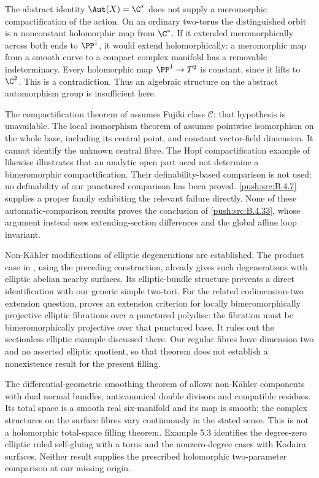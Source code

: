 \begin{remark}
The abstract identity $\Aut(X)=\C^*$ does not supply a
meromorphic compactification of the action. On an ordinary
two-torus the distinguished orbit is a nonconstant holomorphic
map from $\C^*$. If it extended meromorphically across both
ends to $\PP^1$, it would extend holomorphically: a
meromorphic map from a smooth curve to a compact complex
manifold has a removable indeterminacy. Every holomorphic
map $\PP^1\to T^2$ is constant, since it lifts to $\C^2$.
This is a contradiction. Thus an algebraic structure on the
abstract automorphism group is insufficient here.

The compactification theorem of
\citet[Theorem 1.2]{BiliottiGhigi2021Root} assumes Fujiki
class $\mathcal C$; that hypothesis is unavailable.
The local isomorphism theorem of
\citet[Theorem 3]{Meersseman2011Root} assumes pointwise
isomorphism on the whole base, including its central point,
and constant vector-field dimension. It cannot identify the
unknown central fibre. The Hopf compactification example of
\citet[Example 1]{KatzarkovEtAl2025Root} likewise illustrates
that an analytic open part need not determine a bimeromorphic
compactification. Their definability-based comparison is not
used: no definability of our punctured comparison has been
proved. \ref{push:src:B.4.7} supplies a proper family exhibiting the relevant
failure directly. None of these automatic-comparison results
proves the conclusion of \ref{push:src:B.4.33}, whose argument instead uses
extending-section differences and the global affine loop invariant.

Non-K\"ahler modifications of elliptic degenerations are
established. The product case in
\citet[Section 3, Example 3.4(1)]{Fujimoto1988Root}, using
the preceding construction, already gives such degenerations
with elliptic abelian nearby surfaces. Its elliptic-bundle
structure prevents a direct identification with our generic
simple two-tori. For the related codimension-two extension
question, \citet[Theorem 7.1.3]{Nakayama2002Root} proves an
extension criterion for locally bimeromorphically projective
elliptic fibrations over a punctured polydisc: the fibration
must be bimeromorphically projective over that punctured base.
It rules out the sectionless elliptic example discussed there.
Our regular fibres have dimension two and no asserted elliptic
quotient, so that theorem does not establish a nonexistence
result for the present filling.

The differential-geometric smoothing theorem of
\citet[Theorem 5.5, pp.~882--883]{Doi2009Root} allows
non-K\"ahler components with dual normal bundles,
anticanonical double divisors and compatible residues.
Its total space is a smooth real six-manifold and its
map is smooth; the complex structures on the surface
fibres vary continuously in the stated sense.
This is not a holomorphic total-space filling theorem.
Example 5.3 identifies the degree-zero elliptic ruled
self-gluing with a torus and the nonzero-degree cases
with Kodaira surfaces. Neither result supplies the
prescribed holomorphic two-parameter comparison at our
missing origin.
\end{remark}
